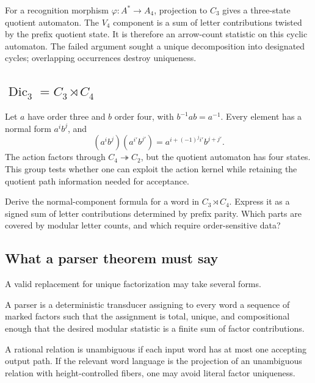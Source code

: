 \documentclass{amsart}
\begin{document}
For a recognition morphism $\varphi:A^\ast\to A_4$, projection to $C_3$ gives a three-state quotient automaton.  The $V_4$ component is a sum of letter contributions twisted by the prefix quotient state.  It is therefore an arrow-count statistic on this cyclic automaton.  The failed argument sought a unique decomposition into designated cycles; overlapping occurrences destroy uniqueness.

\subsection{$\operatorname{Dic}_3=C_3\rtimes C_4$}

Let $a$ have order three and $b$ order four, with $b^{-1}ab=a^{-1}$.  Every element has a normal form $a^i b^j$, and
\[
  (a^i b^j)(a^{i'}b^{j'})
  =a^{i+(-1)^j i'}b^{j+j'}.
\]
The action factors through $C_4\twoheadrightarrow C_2$, but the quotient automaton has four states.  This group tests whether one can exploit the action kernel while retaining the quotient path information needed for acceptance.

\begin{exercise}
Derive the normal-component formula for a word in $C_3\rtimes C_4$.  Express it as a signed sum of letter contributions determined by prefix parity.  Which parts are covered by modular letter counts, and which require order-sensitive data?
\end{exercise}

\subsection{What a parser theorem must say}

A valid replacement for unique factorization may take several forms.
\begin{definition}
A parser is a deterministic transducer assigning to every word a sequence of marked factors such that the assignment is total, unique, and compositional enough that the desired modular statistic is a finite sum of factor contributions.
\end{definition}

\begin{definition}
A rational relation is unambiguous if each input word has at most one accepting output path.  If the relevant word language is the projection of an unambiguous relation with height-controlled fibers, one may avoid literal factor uniqueness.
\end{definition}
\end{document}
